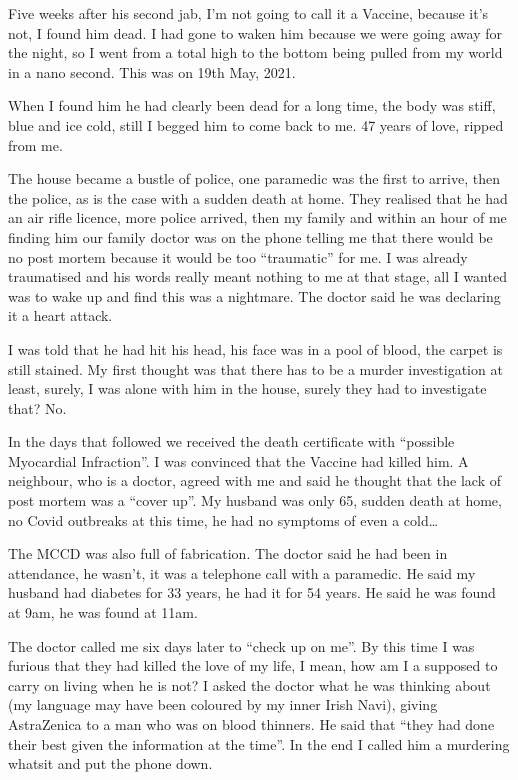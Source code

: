 Five weeks after his second jab, I’m not going to call it a Vaccine, because
it’s not, I found him dead. I had gone to waken him because we were going away
for the night, so I went from a total high to the bottom being pulled from my
world in a nano second. This was on 19th May, 2021.

When I found him he had clearly been dead for a long time, the body was stiff,
blue and ice cold, still I begged him to come back to me. 47 years of love,
ripped from me.

The house became a bustle of police, one paramedic was the first to arrive, then
the police, as is the case with a sudden death at home. They realised that he
had an air rifle licence, more police arrived, then my family and within an hour
of me finding him our family doctor was on the phone telling me that there would
be no post mortem because it would be too “traumatic” for me. I was already
traumatised and his words really meant nothing to me at that stage, all I wanted
was to wake up and find this was a nightmare. The doctor said he was declaring
it a heart attack.

I was told that he had hit his head, his face was in a pool of blood, the carpet
is still stained. My first thought was that there has to be a murder
investigation at least, surely, I was alone with him in the house, surely they
had to investigate that? No.

In the days that followed we received the death certificate with “possible
Myocardial Infraction”. I was convinced that the Vaccine had killed him. A
neighbour, who is a doctor, agreed with me and said he thought that the lack of
post mortem was a “cover up”. My husband was only 65, sudden death at home, no
Covid outbreaks at this time, he had no symptoms of even a cold…

The MCCD was also full of fabrication. The doctor said he had been in
attendance, he wasn’t, it was a telephone call with a paramedic. He said my
husband had diabetes for 33 years, he had it for 54 years. He said he was found
at 9am, he was found at 11am.

The doctor called me six days later to “check up on me”. By this time I was
furious that they had killed the love of my life, I mean, how am I a supposed to
carry on living when he is not? I asked the doctor what he was thinking about
(my language may have been coloured by my inner Irish Navi), giving AstraZenica
to a man who was on blood thinners. He said that “they had done their best given
the information at the time”. In the end I called him a murdering whatsit and
put the phone down.

